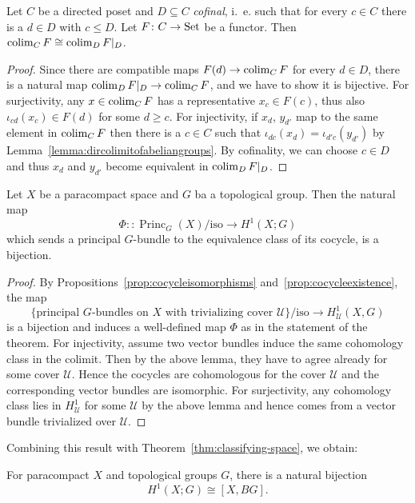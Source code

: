 \documentclass[a4paper,openany]{scrbook}
\DeclareMathOperator{\Princ}{Princ}
\begin{document}
\begin{lemma}\label{lemma:cofinalcolimit}
Let $C$ be a directed poset and $D \subseteq C$ \emph{cofinal}, i.~e. such that for every $c \in C$ there is a $d \in D$ with $c \leq D$. Let $F\colon C \to \operatorname{Set}$ be a functor. Then $\colim_C F \cong \colim_D F|_D$.
\end{lemma}
\begin{proof}
Since there are compatible maps $F(d) \to \colim_C F$ for every $d \in D$, there is a natural map $\colim_D F|_D \to \colim_C F$, and we have to show it is bijective. For surjectivity, any $x \in \colim_C F$ has a representative $x_c \in F(c)$, thus also $\iota_{cd}(x_c) \in F(d)$ for some $d \geq c$. For injectivity, if $x_d$, $y_{d'}$ map to the same element in $\colim_C F$ then there is a $c \in C$ such that $\iota_{dc}(x_d) = \iota_{d'c}(y_{d'})$ by Lemma~\ref{lemma:dircolimitofabeliangroups}. By cofinality, we can choose $c \in D$ and thus $x_d$ and $y_{d'}$ become equivalent in $\colim_D F|_D$.
\end{proof}

\begin{thm}\label{thm:principalbundlesbycechcohomology}
Let $X$ be a paracompact space and $G$ ba a topological group. Then the natural map
\[
\Phi\colon\colon \Princ_G(X)/\text{iso} \to H^1(X;G)
\]
which sends a principal $G$-bundle to the equivalence class of its cocycle, is a bijection.
\end{thm}
\begin{proof}
By Propositions~\ref{prop:cocycleisomorphisms} and~\ref{prop:cocycleexistence}, the map
\[
\{\text{principal $G$-bundles on $X$ with trivializing cover $\mathcal U$}\}/\text{iso} \to H_\mathcal U^1(X,G)
\]
is a bijection and induces a well-defined map $\Phi$ as in the statement of the theorem. For injectivity, assume two vector bundles induce the same cohomology class in the colimit. Then by the above lemma, they have to agree already for some cover $\mathcal U$. Hence the cocycles are cohomologous for the cover $\mathcal U$ and the corresponding vector bundles are isomorphic. For surjectivity, any cohomology class lies in $H^1_{\mathcal U}$ for some $\mathcal U$ by the above lemma and hence comes from a vector bundle trivialized over $\mathcal U$.
\end{proof}

Combining this result with Theorem~\ref{thm:classifying-space}, we obtain:

\begin{corollary}\label{cor:H1representable}
For paracompact $X$ and topological groups $G$, there is a natural bijection
\[
H^1(X;G) \cong [X,BG].
\]
\end{corollary}
\end{document}
